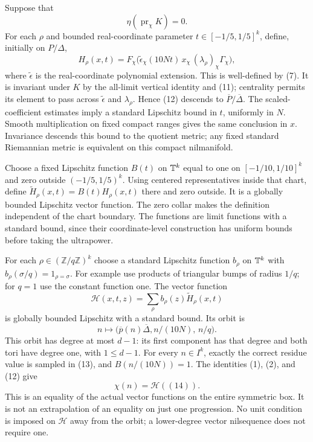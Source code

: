 \documentclass[11pt]{article}
\newcommand{\Z}{\mathbb Z}\newcommand{\R}{\mathbb R}
\begin{document}
Suppose that
\[
                  \eta(\operatorname{pr}_\chi K)=0.            \tag{11}
\]
For each $\rho$ and bounded real-coordinate parameter $t\in[-1/5,1/5]^k$,
define, initially on $P/\Delta$,
\[
 H_\rho(x,t)=F_\chi\bigl(
   \widetilde\epsilon_\chi(10Nt)\,x_\chi\,(\lambda_\rho)_\chi
                                                    \Gamma_\chi\bigr), \tag{12}
\]
where $\widetilde\epsilon$ is the real-coordinate polynomial extension.
This is well-defined by (7). It is invariant under $K$ by the all-limit
vertical identity and (11); centrality permits its element to pass across
$\widetilde\epsilon$ and $\lambda_\rho$. Hence (12) descends to
$\overline P/\overline\Delta$.
The scaled-coefficient estimates imply a standard Lipschitz bound in $t$,
uniformly in $N$. Smooth multiplication on fixed compact ranges gives the
same conclusion in $x$. Invariance descends this bound to the quotient
metric; any fixed standard Riemannian metric is equivalent on this compact
nilmanifold.

Choose a fixed Lipschitz function $B(t)$ on $\mathbb T^k$ equal to one on
$[-1/10,1/10]^k$ and zero outside $(-1/5,1/5)^k$.
Using centered representatives inside that chart, define
$\widetilde H_\rho(x,t)=B(t)H_\rho(x,t)$ there and zero outside.
It is a globally bounded Lipschitz vector function. The zero collar makes
the definition independent of the chart boundary. The functions are limit
functions with a standard bound, since their coordinate-level construction
has uniform bounds before taking the ultrapower.

For each $\rho\in(\Z/q\Z)^k$ choose a standard Lipschitz function
$b_\rho$ on $\mathbb T^k$ with
$b_\rho(\sigma/q)=1_{\rho=\sigma}$. For example use products of triangular
bumps of radius $1/q$; for $q=1$ use the constant function one.
The vector function
\[
 \mathcal H(x,t,z)=\sum_\rho b_\rho(z)\widetilde H_\rho(x,t)    \tag{13}
\]
is globally bounded Lipschitz with a standard bound. Its orbit is
\[
          n\longmapsto\bigl(\overline p(n)\overline\Delta,
                                      n/(10N),\,n/q\bigr).    \tag{14}
\]
This orbit has degree at most $d-1$: its first component has that degree
and both tori have degree one, with $1\leq d-1$.
For every $n\in I^k$, exactly the correct residue value is sampled in
(13), and $B(n/(10N))=1$. The identities (1), (2), and (12) give
\[
                        \chi(n)=\mathcal H((14)).              \tag{15}
\]
This is an equality of the actual vector functions on the entire symmetric
box. It is not an extrapolation of an equality on just one progression.
No unit condition is imposed on $\mathcal H$ away from the orbit; a
lower-degree vector nilsequence does not require one.
\end{document}
